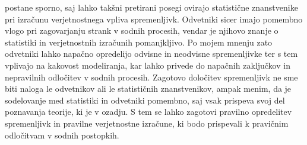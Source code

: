 \documentclass[fin1, tisk]{fmfdelo}
\theoremstyle{definition}
\theoremstyle{trditev}
\theoremstyle{izrek}
\begin{document}
postane sporno, saj lahko takšni pretirani posegi ovirajo statistične znanstvenike pri izračunu verjetnostnega vpliva spremenljivk. Odvetniki sicer
imajo pomembno vlogo pri zagovarjanju strank v sodnih procesih, vendar je njihovo znanje o statistiki in verjetnostnih izračunih pomanjkljivo. Po
mojem mnenju zato odvetniki lahko napačno opredelijo odvisne in neodvisne spremenljivke ter s tem vplivajo na kakovost modeliranja, kar lahko privede
do napačnih zaključkov in nepravilnih odločitev v sodnih procesih. Zagotovo določitev spremenljivk ne sme biti naloga le odvetnikov ali le statističnih
znanstvenikov, ampak menim, da je sodelovanje med statistiki in odvetniki pomembno, saj vsak prispeva svoj del poznavanja teorije,
ki je v ozadju.  S tem se lahko zagotovi pravilno opredelitev spremenljivk in pravilne verjetnostne izračune, ki bodo prispevali k pravičnim
odločitvam v sodnih postopkih.

\end{document}
